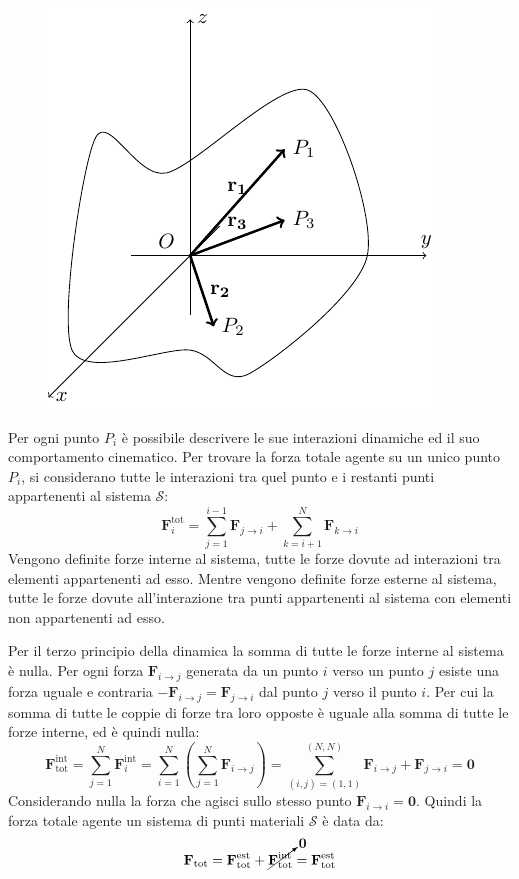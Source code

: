 \documentclass{article}
\newcommand{\vect}[1]{\boldsymbol{\mathbf{#1}}}
\numberwithin{equation}{subsection}
\begin{document}
\begin{figure}[H]%
    \centering
    \includegraphics{insieme-punti.pdf}%
\end{figure}

Per ogni punto $P_i$ è possibile descrivere le sue interazioni dinamiche ed il suo comportamento cinematico. 
Per trovare la forza totale agente su un unico punto $P_i$, si 
considerano tutte le interazioni tra quel punto e i restanti punti 
appartenenti al sistema $\mathscr{S}$:
\begin{equation}
    \vect{F}^\mathrm{tot}_i=\displaystyle\sum_{j=1}^{i-1}\vect{F}_{j\to i}+\sum_{k=i+1}^{N}\vect{F}_{k\to i}
\end{equation}
Vengono definite forze interne al sistema, tutte le forze 
dovute ad interazioni tra elementi appartenenti ad esso.
Mentre vengono definite forze esterne al sistema, tutte le forze 
dovute all'interazione tra punti appartenenti al sistema con 
elementi non appartenenti ad esso. 



Per il terzo principio della dinamica 
la somma di tutte le forze interne al sistema è nulla. Per ogni 
forza $\vect{F}_{i\to j}$ generata da un punto $i$ verso un punto $j$ 
esiste una forza uguale e contraria $-\vect{F}_{i\to j}=\vect{F}_{j\to i}$ dal punto $j$ verso il punto $i$. 
Per cui la somma di tutte le coppie di forze tra loro opposte 
è uguale alla somma di tutte le forze interne, ed è quindi nulla:
\begin{equation}
    \vect{F}_\mathrm{tot}^\mathrm{int}=\displaystyle\sum_{j=1}^{N}\vect{F}_i^\mathrm{int}=\sum_{i=1}^{N}\left(\sum_{j=1}^{N}\vect{F}_{i\to j}\right)=\sum_{(i,j)=(1,1)}^{(N,N)}\vect{F}_{i\to j}+\vect{F}_{j\to i}=\vect{0}
\end{equation}
Considerando nulla la forza che agisci sullo stesso punto $\vect{F}_{i\to i}=\vect{0}$.
Quindi la forza totale agente un sistema di punti materiali $\mathscr{S}$ è data da:
\begin{equation}
    \vect{F}_\mathrm{tot}=\vect{F}^\mathrm{est}_\mathrm{tot}+\cancelto{\vect0}{\vect{F}^\mathrm{int}_\mathrm{tot}}=\vect{F}^\mathrm{est}_\mathrm{tot}
\end{equation}
\end{document}

